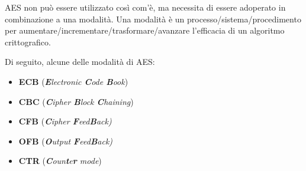 \textsf{\small AES non può essere utilizzato così com'è, ma necessita di essere adoperato in combinazione a una modalità. } %
\textsf{\small Una modalità è un processo/sistema/procedimento per aumentare/incrementare/trasformare/avanzare l'efficacia di un algoritmo crittografico.  } %

\textsf{\small Di seguito, alcune delle modalità di AES: }

\begin{itemize} %
	\item \textsf{\small \textbf{ECB} (\emph{\textbf{E}lectronic \textbf{C}ode \textbf{B}ook})}
	\item \textsf{\small \textbf{CBC} (\emph{\textbf{C}ipher \textbf{B}lock \textbf{C}haining})}
	\item \textsf{\small \textbf{CFB} (\emph{\textbf{C}ipher \textbf{F}eed\textbf{B}ack)}}
	\item \textsf{\small \textbf{OFB} (\emph{\textbf{O}utput \textbf{F}eed\textbf{B}ack)}}
	\item \textsf{\small \textbf{CTR} (\emph{\textbf{C}oun\textbf{t}e\textbf{r} mode})}
\end{itemize} 


\newpage

